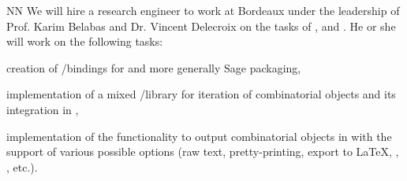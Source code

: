 \begin{participant}[type=R, PM=34]{NN}
We will hire a research engineer to work at Bordeaux
 under the leadership of Prof. Karim Belabas and Dr. Vincent
Delecroix on the tasks of ,  and .
He or she will work on the following tasks:
\begin{compactitem}
\item creation of \Cython/\Python bindings for \PariGP and more generally Sage packaging,
\item implementation of a mixed /\Python library for iteration of combinatorial
objects and its integration in \Sage,
\item implementation of the functionality to output combinatorial objects in \Sage
with the support of various possible options (raw text, pretty-printing, export to 
\LaTeX, , , etc.).
\end{compactitem}
\end{participant}
